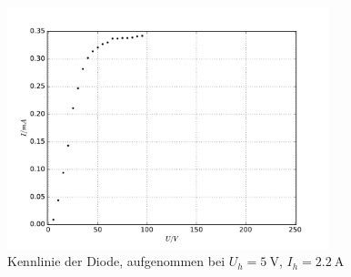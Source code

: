 \begin{figure}
  \centering
  \includegraphics[height=7cm]{./plots/Plot5.pdf}
  \caption{Kennlinie der Diode, aufgenommen bei $U_h = \SI{5}{\volt}$, $I_h = \SI{2.2}{\ampere}$}
  \label{fig:Plot5}
\end{figure}

